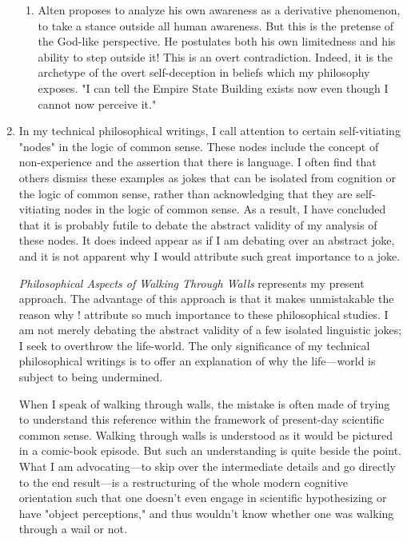 \documentclass[10pt,twoside]{memoir}
\newcommand{\essaytitle}[1]{
	\emph{#1}}
\begin{document}
\begin{enumerate}
\begin{enumerate}
\item Alten proposes to analyze his own awareness as a derivative 
phenomenon, to take a stance outside all human awareness. But this is the 
pretense of the God-like perspective. He postulates both his own limitedness 
and his ability to step outside it! This is an overt contradiction. Indeed, it is 
the archetype of the overt self-deception in beliefs which my philosophy 
exposes. "I can tell the Empire State Building exists now even though I 
cannot now perceive it." 
\end{enumerate}

\item In my technical philosophical writings, I call attention to certain 
self-vitiating "nodes" in the logic of common sense. These nodes include the 
concept of non-experience and the assertion that there is language. I often 
find that others dismiss these examples as jokes that can be isolated from 
cognition or the logic of common sense, rather than acknowledging that they 
are self-vitiating nodes in the logic of common sense. As a result, I have 
concluded that it is probably futile to debate the abstract validity of my 
analysis of these nodes. It does indeed appear as if I am debating over an 
abstract joke, and it is not apparent why I would attribute such great 
importance to a joke. 

\essaytitle{Philosophical Aspects of Walking Through Walls} represents my 
present approach. The advantage of this approach is that it makes 
unmistakable the reason why ! attribute so much importance to these 
philosophical studies. I am not merely debating the abstract validity of a few 
isolated linguistic jokes; I seek to overthrow the life-world. The only 
significance of my technical philosophical writings is to offer an explanation 
of why the life---world is subject to being undermined. 

When I speak of walking through walls, the mistake is often made of 
trying to understand this reference within the framework of present-day 
scientific common sense. Walking through walls is understood as it would be 
pictured in a comic-book episode. But such an understanding is quite beside 
the point. What I am advocating---to skip over the intermediate details and go 
directly to the end result---is a restructuring of the whole modern cognitive 
orientation such that one doesn't even engage in scientific hypothesizing or 
have "object perceptions," and thus wouldn't know whether one was 
walking through a wail or not. 


\end{enumerate}
\end{document}
